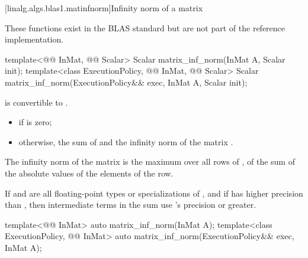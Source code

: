 [linalg.algs.blas1.matinfnorm]{Infinity norm of a matrix}

\pnum
\begin{note}
These functions exist in the BLAS standard\supercite{blas-std}
but are not part of the reference implementation.
\end{note}

%
\begin{itemdecl}
template<@@ InMat, @@ Scalar>
  Scalar matrix_inf_norm(InMat A, Scalar init);
template<class ExecutionPolicy, @@ InMat, @@ Scalar>
  Scalar matrix_inf_norm(ExecutionPolicy&& exec, InMat A, Scalar init);
\end{itemdecl}

\begin{itemdescr}
\pnum
\mandates
{}
is convertible to .

\pnum
\returns
\begin{itemize}
\item
{} if  is zero;
\item
otherwise,
the sum of  and the infinity norm of the matrix .
\end{itemize}
\begin{note}
The infinity norm of the matrix 
is the maximum over all rows of ,
of the sum of the absolute values
of the elements of the row.
\end{note}

\pnum
\remarks
If  and 
are all floating-point types or specializations of ,
and if  has higher precision
than ,
then intermediate terms in the sum use 's precision or greater.
\end{itemdescr}

%
\begin{itemdecl}
template<@@ InMat>
  auto matrix_inf_norm(InMat A);
template<class ExecutionPolicy, @@ InMat>
  auto matrix_inf_norm(ExecutionPolicy&& exec, InMat A);
\end{itemdecl}

